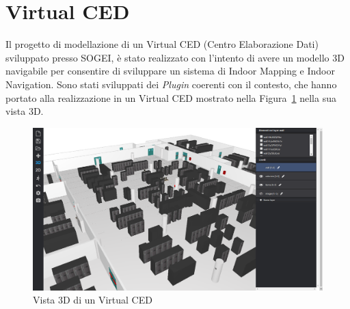 \section{Virtual CED}
\label{sec:chapter_4_section_3}
Il progetto di modellazione di un Virtual CED (Centro Elaborazione Dati) sviluppato presso SOGEI, \`e stato realizzato con
l'intento di avere un modello 3D navigabile per consentire di sviluppare un sistema di Indoor Mapping e Indoor Navigation.
Sono stati sviluppati dei \emph{Plugin} coerenti con il contesto, che hanno portato alla realizzazione in un
Virtual CED mostrato nella Figura~\ref{fig:virtualCED} nella sua vista 3D.\\

\begin{figure}[htbp] %
   \centering
   \includegraphics[width=1\linewidth]{images/virtualCED}
   \caption{Vista 3D di un Virtual CED}
   \label{fig:virtualCED}
   \end{figure}
\newpage

